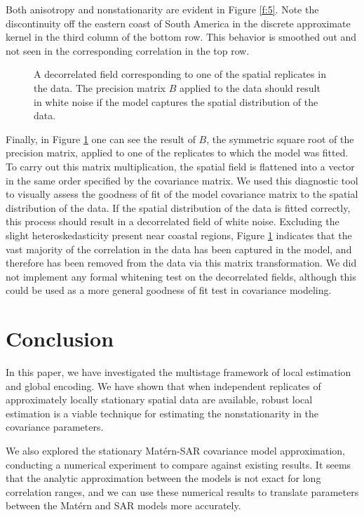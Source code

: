 \documentclass[review]{elsarticle}
\begin{document}
Both anisotropy and nonstationarity are evident in Figure \ref{f:5}. Note the discontinuity off the eastern coast of South America in the discrete approximate kernel in the third column of the bottom row. This behavior is smoothed out and not seen in the corresponding correlation in the top row.


\begin{figure}
    \centering
    \caption{A decorrelated field corresponding to one of the spatial replicates in the data. The precision matrix $B$ applied to the data should result in white noise if the model captures the spatial distribution of the data.}
    \label{f:6}
\end{figure}

Finally, in Figure \ref{f:6} one can see the result of $B$, the symmetric square root of the precision matrix, applied to one of the replicates to which the model was fitted. To carry out this matrix multiplication, the spatial field is flattened into a vector in the same order specified by the covariance matrix. We used this diagnostic tool to visually assess the goodness of fit of the model covariance matrix to the spatial distribution of the data. If the spatial distribution of the data is fitted correctly, this process should result in a decorrelated field of white noise. Excluding the slight heteroskedasticity present near coastal regions, Figure \ref{f:6} indicates that the vast majority of the correlation in the data has been captured in the model, and therefore has been removed from the data via this matrix transformation. We did not implement any formal whitening test on the decorrelated fields, although this could be used as a more general goodness of fit test in covariance modeling.


\section{Conclusion}

In this paper, we have investigated the multistage framework of local estimation and global encoding. We have shown that when independent replicates of approximately locally stationary spatial data are available, robust local estimation is a viable technique for estimating the nonstationarity in the covariance parameters.

We also explored the stationary Mat\'ern-SAR covariance model approximation, conducting a numerical experiment to compare against existing results. It seems that the analytic approximation between the models is not exact for long correlation ranges, and we can use these numerical results to translate parameters between the Mat\'ern and SAR models more accurately.
\end{document}
